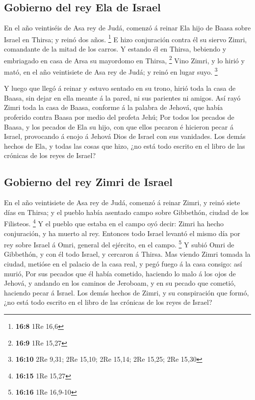 \hypertarget{gobierno-del-rey-ela-de-israel}{%
\subsection{Gobierno del rey Ela de
Israel}\label{gobierno-del-rey-ela-de-israel}}

 En el año veintiséis de Asa rey de Judá, comenzó á reinar
Ela hijo de Baasa sobre Israel en Thirsa; y reinó dos años. \footnote{\textbf{16:8}
  1Re 16,6}  E hizo conjuración contra él su siervo Zimri,
comandante de la mitad de los carros. Y estando él en Thirsa, bebiendo y
embriagado en casa de Arsa su mayordomo en Thirsa, \footnote{\textbf{16:9}
  1Re 15,27}  Vino Zimri, y lo hirió y mató, en el año
veintisiete de Asa rey de Judá; y reinó en lugar suyo. \footnote{\textbf{16:10}
  2Re 9,31; 2Re 15,10; 2Re 15,14; 2Re 15,25; 2Re 15,30}

 Y luego que llegó á reinar y estuvo sentado en su trono,
hirió toda la casa de Baasa, sin dejar en ella meante á la pared, ni sus
parientes ni amigos.  Así rayó Zimri toda la casa de
Baasa, conforme á la palabra de Jehová, que había proferido contra Baasa
por medio del profeta Jehú;  Por todos los pecados de
Baasa, y los pecados de Ela su hijo, con que ellos pecaron é hicieron
pecar á Israel, provocando á enojo á Jehová Dios de Israel con sus
vanidades.  Los demás hechos de Ela, y todas las cosas
que hizo, ¿no está todo escrito en el libro de las crónicas de los reyes
de Israel?

\hypertarget{gobierno-del-rey-zimri-de-israel}{%
\subsection{Gobierno del rey Zimri de
Israel}\label{gobierno-del-rey-zimri-de-israel}}

 En el año veintisiete de Asa rey de Judá, comenzó á
reinar Zimri, y reinó siete días en Thirsa; y el pueblo había asentado
campo sobre Gibbethón, ciudad de los Filisteos. \footnote{\textbf{16:15}
  1Re 15,27}  Y el pueblo que estaba en el campo oyó
decir: Zimri ha hecho conjuración, y ha muerto al rey. Entonces todo
Israel levantó el mismo día por rey sobre Israel á Omri, general del
ejército, en el campo. \footnote{\textbf{16:16} 1Re 16,9-10}
 Y subió Omri de Gibbethón, y con él todo Israel, y
cercaron á Thirsa.  Mas viendo Zimri tomada la ciudad,
metióse en el palacio de la casa real, y pegó fuego á la casa consigo:
así murió,  Por sus pecados que él había cometido,
haciendo lo malo á los ojos de Jehová, y andando en los caminos de
Jeroboam, y en su pecado que cometió, haciendo pecar á Israel.
 Los demás hechos de Zimri, y su conspiración que formó,
¿no está todo escrito en el libro de las crónicas de los reyes de
Israel?

